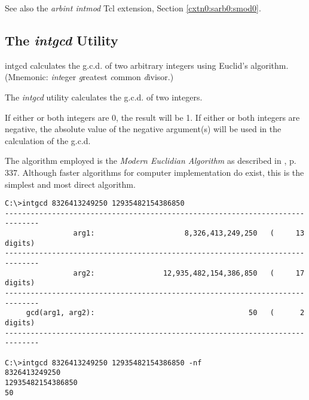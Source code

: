 \begin{dosutilcommandseealso}
See also the \emph{arbint intmod} Tcl extension, 
Section \ref{cxtn0:sarb0:smod0}.
\end{dosutilcommandseealso}


\subsection{The \emph{intgcd} Utility}
\label{cdcm0:sali0:sgcd0}

\begin{dosutilcommandname}{intgcd}%
calculates the g.c.d. of two arbitrary integers using
Euclid's algorithm.  (Mnemonic:  \emph{int}eger
\emph{g}reatest \emph{c}ommon \emph{d}ivisor.)
\end{dosutilcommandname}

\begin{dosutilcommandsynopsis}
\end{dosutilcommandsynopsis}

\begin{dosutilcommanddescription}
The \emph{intgcd} utility calculates the g.c.d. of two
integers.

If either or both integers are 0, the result will be 1.
If either or both integers are negative, the absolute 
value of the negative argument(s) will be used in the
calculation of the g.c.d.

The algorithm employed is the
\emph{Modern Euclidian Algorithm} as
described in \cite{bibref:b:knuthclassic2ndedvol2}, p. 337.
Although faster algorithms for computer
implementation do exist, this is the simplest
and most direct algorithm.
\end{dosutilcommanddescription}

\begin{dosutilcommandsampleinvocations}
\begin{scriptsize}
\begin{verbatim}
C:\>intgcd 8326413249250 12935482154386850
------------------------------------------------------------------------------
                arg1:                     8,326,413,249,250   (     13 digits)
------------------------------------------------------------------------------
                arg2:                12,935,482,154,386,850   (     17 digits)
------------------------------------------------------------------------------
     gcd(arg1, arg2):                                    50   (      2 digits)
------------------------------------------------------------------------------

C:\>intgcd 8326413249250 12935482154386850 -nf
8326413249250
12935482154386850
50
\end{verbatim}
\end{scriptsize}
\end{dosutilcommandsampleinvocations}

